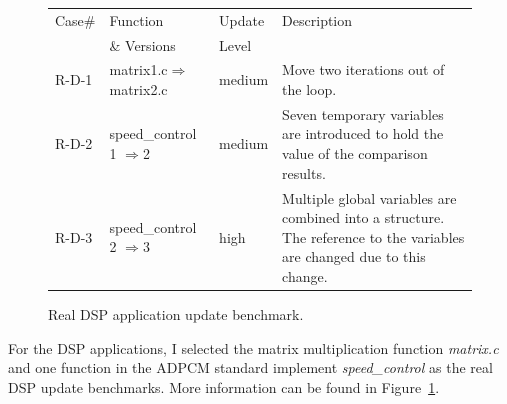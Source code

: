 \begin{figure}[htdp]
\begin{small}
\begin{center}
\begin{tabular}{||p{0.5in}|p{1.5in}|p{0.6in}|p{3.5in}||}
\hline
Case\#  &  Function & Update & Description \\
 & \& Versions &Level&\\
\hline\hline
R-D-1 &  matrix1.c$\Rightarrow$matrix2.c& medium & Move two iterations out of the loop.\\
\hline
R-D-2 &  speed\_control 1 $\Rightarrow$2 & medium &Seven temporary variables are introduced to hold the value of the comparison results.\\
\hline
R-D-3 & speed\_control 2 $\Rightarrow$3 &high &  Multiple global variables are combined into a structure. The reference to the variables are changed due to this change.\\
\hline
\end{tabular}
\end{center}
\caption{Real DSP application update benchmark. }
\label{dsp-bench}
\end{small}
\end{figure}
For the DSP applications, I selected the matrix multiplication function {\it matrix.c} and one function in the ADPCM 
standard implement {\it speed\_control} as the real DSP update benchmarks. More information can be found in 
Figure~\ref{dsp-bench}. 



